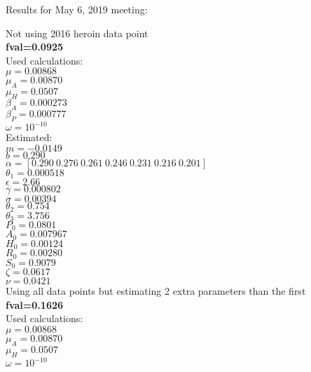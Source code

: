 \documentclass[12pt]{article}
\begin{document}
\pagebreak
Results for May 6, 2019 meeting: 

\begin{multicols}{2}
Not using 2016 heroin data point \\
\textbf{fval=0.0925} \\
Used calculations: \\
$\mu=0.00868$ \\
$\mu_{A}=0.00870$ \\
$\mu_{H}=0.0507$ \\
$\beta_A=0.000273$ \\
$\beta_P=0.000777$ \\
$\omega=10^{-10}$ \\ 

Estimated: \\
$m=-0.0149$ \\
$b=0.290$\\
$\alpha=[0.290  \   0.276  \   0.261    \   0.246 \    0.231    \     0.216  \  0.201  ]$ \\
$\theta_1=0.000518 $\\
$\epsilon=2.66$ \\
$\gamma=0.000802$\\
$\sigma=0.00394$ \\
$\theta_2=0.754$  \\
$\theta_3=3.756$ \\
$P_0=0.0801$ \\
$A_0=0.007967$ \\
$H_0=0.00124$ \\
$R_0=0.00280$ \\
$S_0=0.9079$ \\
$\zeta=0.0617$ \\
$\nu=0.0421$ \\ 


\columnbreak
Using all data points but estimating 2 extra parameters than the first \\
\textbf{fval=0.1626} \\
Used calculations: \\
$\mu=0.00868$ \\
$\mu_{A}=0.00870$ \\
$\mu_{H}=0.0507$ \\
$\omega=10^{-10}$ \\ 
\vspace{0.6cm}


\end{multicols}
\end{document}
